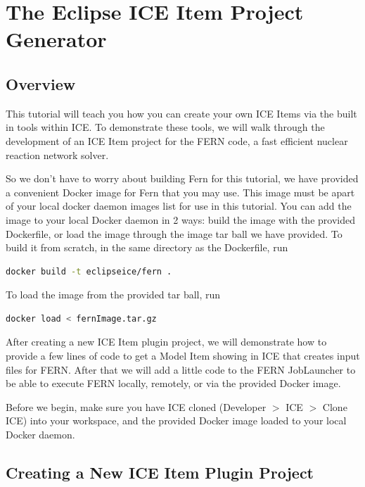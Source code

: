 \chapter{The Eclipse ICE Item Project Generator}

\section*{Overview} 

This tutorial will teach you how you
can create your own ICE Items via the built in tools within ICE.  To demonstrate
these tools, we will walk through the development of an ICE Item project for the
FERN code, a fast efficient nuclear reaction network solver. 

So we don't have to worry about building Fern for this tutorial, we have
provided a convenient Docker image for Fern that you may use.  
This image must be apart of your local docker daemon images list for use in this
tutorial. You can add the image to your local Docker daemon in 2 ways: build the
image with the provided Dockerfile, or load the image through the image tar ball we have provided. To
build it from scratch, in the same directory as the Dockerfile, run 
\begin{lstlisting}[language=bash,caption={bash version}]
docker build -t eclipseice/fern .
\end{lstlisting}
To load the image from the provided tar ball, run 
\begin{lstlisting}[language=bash,caption={bash version}]
docker load < fernImage.tar.gz
\end{lstlisting}

After creating a new ICE Item plugin project, we will demonstrate how to
provide a few lines of code to get a Model Item showing in ICE that creates
input files for FERN. After that we will add a little code to the FERN
JobLauncher to be able to execute FERN locally, remotely, or via the
provided Docker image. 

Before we begin, make sure you have ICE cloned (Developer $>$ ICE $>$ Clone ICE)
into your workspace, and the provided Docker image loaded to your local Docker daemon. 

\section*{Creating a New ICE Item Plugin Project}

